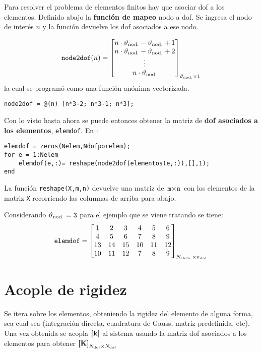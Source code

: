 Para resolver el problema de elementos finitos hay que asociar dof a los elementos. Definido abajo la \textbf{función de mapeo} nodo a dof. Se ingresa el nodo de interés $n$ y la función devuelve los dof asociados a ese nodo.

\begin{equation}
\texttt{node2dof}(n) = \begin{bmatrix}
n\cdot\vartheta_{\mathrm{nod.}}-\vartheta_{\mathrm{nod.}} +1 \\ n\cdot\vartheta_{\mathrm{nod.}}-\vartheta_{\mathrm{nod.}} +2 \\ \vdots \\ n\cdot\vartheta_{\mathrm{nod.}}
\end{bmatrix}_{\vartheta_{\mathrm{nod.}}\times 1}
\end{equation}
la cual se programó como una función anónima vectorizada.

\begin{lstlisting}[caption = {\texttt{node2dof} para \Ndofpornod=3. }]
node2dof = @(n) [n*3-2; n*3-1; n*3];
\end{lstlisting}

Con lo visto hasta ahora se puede entonces obtener la matriz de \textbf{dof asociados a los elementos}, \texttt{elemdof}. En \Matlab{}:
\begin{lstlisting}[caption = {Obtención de matriz elemdof.}]
elemdof = zeros(Nelem,Ndofporelem);
for e = 1:Nelem
	elemdof(e,:)= reshape(node2dof(elementos(e,:)),[],1);
end
\end{lstlisting}

La función \texttt{reshape(X,m,n)} devuelve una matriz de $\texttt{m}\times\texttt{n}$ con los elementos de la matriz \texttt{X} recorriendo las columnas de arriba para abajo.

Considerando $\vartheta_{\mathrm{nod.}}=3$ para el ejemplo que se viene tratando se tiene:
\begin{equation} \label{eq:MatrizElemdofEjemplo}
\texttt{elemdof} = \begin{bmatrix}
1 & 2 & 3 & 4 & 5 & 6 \\
4 & 5 & 6 & 7 & 8 & 9  \\
13 & 14 & 15 & 10 & 11 & 12 \\
10 & 11 & 12 & 7 & 8 & 9 
\end{bmatrix}_{ N_{\mathrm{elem.}} \times n_{\mathrm{dof}} } 
\end{equation}

\section{Acople de rigidez}
Se itera sobre los elementos, obteniendo la rigidez del elemento de alguna forma, sea cual sea (integración directa, cuadratura de Gauss, matriz predefinida, etc). Una vez obtenida se acopla $\boldsymbol{[}\mathbf{k} \boldsymbol{]}$ al sistema usando la matriz dof asociados a los elementos para obtener $\boldsymbol{[}\mathbf{K} \boldsymbol{]}_{N_{\mathrm{dof}} \times N_{\mathrm{dof}}}$

